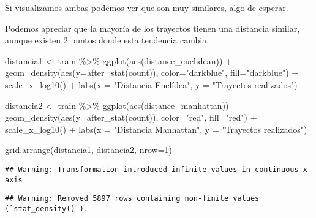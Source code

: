 \documentclass[
]{article}
\newenvironment{Shaded}{\begin{snugshade}}{\end{snugshade}}
\newcommand{\AttributeTok}[1]{\textcolor[rgb]{0.77,0.63,0.00}{#1}}
\newcommand{\DecValTok}[1]{\textcolor[rgb]{0.00,0.00,0.81}{#1}}
\newcommand{\FunctionTok}[1]{\textcolor[rgb]{0.00,0.00,0.00}{#1}}
\newcommand{\NormalTok}[1]{#1}
\newcommand{\OtherTok}[1]{\textcolor[rgb]{0.56,0.35,0.01}{#1}}
\newcommand{\SpecialCharTok}[1]{\textcolor[rgb]{0.00,0.00,0.00}{#1}}
\newcommand{\StringTok}[1]{\textcolor[rgb]{0.31,0.60,0.02}{#1}}
\begin{document}
Si visualizamos ambas podemos ver que son muy similares, algo de
esperar.

Podemos apreciar que la mayoría de los trayectos tienen una distancia
similar, aunque existen 2 puntos donde esta tendencia cambia.

\begin{Shaded}
\begin{Highlighting}[]
\NormalTok{distancia1 }\OtherTok{\textless{}{-}}\NormalTok{ train }\SpecialCharTok{\%\textgreater{}\%}
  \FunctionTok{ggplot}\NormalTok{(}\FunctionTok{aes}\NormalTok{(distance\_euclidean)) }\SpecialCharTok{+}
  \FunctionTok{geom\_density}\NormalTok{(}\FunctionTok{aes}\NormalTok{(}\AttributeTok{y=}\FunctionTok{after\_stat}\NormalTok{(count)), }\AttributeTok{color=}\StringTok{"darkblue"}\NormalTok{, }\AttributeTok{fill=}\StringTok{"darkblue"}\NormalTok{) }\SpecialCharTok{+}
  \FunctionTok{scale\_x\_log10}\NormalTok{() }\SpecialCharTok{+}
  \FunctionTok{labs}\NormalTok{(}\AttributeTok{x =} \StringTok{"Distancia Euclídea"}\NormalTok{, }\AttributeTok{y =} \StringTok{"Trayectos realizados"}\NormalTok{)}

\NormalTok{distancia2 }\OtherTok{\textless{}{-}}\NormalTok{ train }\SpecialCharTok{\%\textgreater{}\%}
  \FunctionTok{ggplot}\NormalTok{(}\FunctionTok{aes}\NormalTok{(distance\_manhattan)) }\SpecialCharTok{+}
  \FunctionTok{geom\_density}\NormalTok{(}\FunctionTok{aes}\NormalTok{(}\AttributeTok{y=}\FunctionTok{after\_stat}\NormalTok{(count)), }\AttributeTok{color=}\StringTok{"red"}\NormalTok{, }\AttributeTok{fill=}\StringTok{"red"}\NormalTok{) }\SpecialCharTok{+}
  \FunctionTok{scale\_x\_log10}\NormalTok{() }\SpecialCharTok{+}
  \FunctionTok{labs}\NormalTok{(}\AttributeTok{x =} \StringTok{"Distancia Manhattan"}\NormalTok{, }\AttributeTok{y =} \StringTok{"Trayectos realizados"}\NormalTok{)}

\FunctionTok{grid.arrange}\NormalTok{(distancia1, distancia2, }\AttributeTok{nrow=}\DecValTok{1}\NormalTok{)}
\end{Highlighting}
\end{Shaded}

\begin{verbatim}
## Warning: Transformation introduced infinite values in continuous x-axis
\end{verbatim}

\begin{verbatim}
## Warning: Removed 5897 rows containing non-finite values (`stat_density()`).
\end{verbatim}
\end{document}
